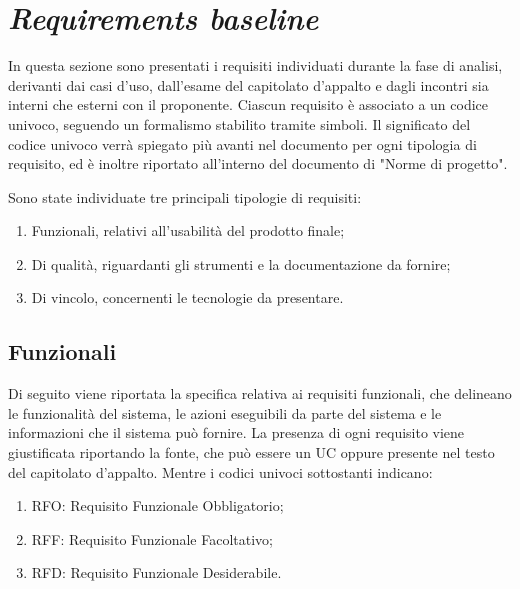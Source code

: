 \section{\textit{Requirements baseline}}

In questa sezione sono presentati i requisiti individuati durante la fase di analisi, derivanti dai casi d'uso, dall'esame del capitolato d'appalto e dagli incontri 
sia interni che esterni con il proponente. Ciascun requisito è associato a un codice univoco, seguendo un formalismo stabilito tramite simboli.
Il significato del codice univoco verrà spiegato più avanti nel documento per ogni tipologia di requisito, ed è inoltre riportato all'interno del documento di "Norme di progetto".

Sono state individuate tre principali tipologie di requisiti:
\begin{enumerate}
	\item Funzionali, relativi all'usabilità del prodotto finale;
	\item Di qualità, riguardanti gli strumenti e la documentazione da fornire;
	\item Di vincolo, concernenti le tecnologie da presentare.
\end{enumerate}

\subsection{Funzionali}

Di seguito viene riportata la specifica relativa ai requisiti funzionali, che delineano le funzionalità del sistema, le azioni eseguibili 
da parte del sistema e le informazioni che il sistema può fornire. La presenza di ogni requisito viene giustificata riportando la fonte, che può essere un UC oppure presente 
nel testo del capitolato d'appalto. Mentre i codici univoci sottostanti indicano:
\begin{enumerate}
	\item RFO: Requisito Funzionale Obbligatorio;
	\item RFF: Requisito Funzionale Facoltativo;
	\item RFD: Requisito Funzionale Desiderabile.
\end{enumerate}


